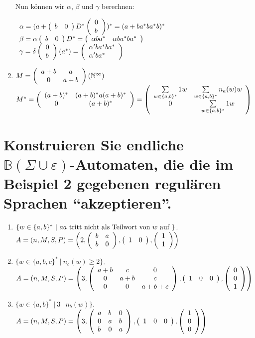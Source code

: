 \documentclass[]{scrartcl}
\newcommand{\matr}[2]{\left(\begin{array}{#1}#2\end{array}\right)}
\newcommand{\e}{\varepsilon}
\begin{document}
\begin{enumerate}
	Nun können wir $\alpha$, $\beta$ und $\gamma$ berechnen:
	
	$
		\begin{array}{l l}
			\alpha = (a + \matr{l l}{b & 0} D^* \matr{l}{0\\b})^* = (a + ba^*ba^*b)^*\\
			\beta = \alpha \matr{l l}{b & 0} D^* = \matr{l l}{\alpha ba^* & \alpha ba^*ba^*} \\
			\gamma = \delta \matr{l}{0\\b} (a^*) =
				\matr{l}{
					\alpha' ba^*ba^*\\
					\alpha' ba^*\\
						}
		\end{array}
	$
	
	\item $ M = \matr{c c}{a+b & a \\ 0 & a+b}  (\mathbb{N}^\infty)$\\
	
	$M^* = \matr{c c}{
		(a+b)^* & (a+b)^*a(a+b)^*\\
		0 & (a+b)^*
	} =
	\matr{c c}{
		\sum\limits_{w \in \{a, b\}^*} 1w & \sum\limits_{w \in \{a,b\}^*} n_a(w)w \\
		0 & \sum\limits_{w \in \{a,b\}^*} 1w\\
	}$
\end{enumerate}

\section{Konstruieren Sie endliche $\mathbb{B}(\Sigma \cup \e)$-Automaten, die die im Beispiel 2 gegebenen regulären Sprachen ``akzeptieren''.}

\begin{enumerate}
	\item $\{w \in \{ a,b \}^*\ |\ aa \textnormal{ tritt nicht als Teilwort von } w \textnormal{ auf } \}$.\\
	
	$A = (n,M,S,P) = \left(2, \matr{l l}{b & a \\ b & 0}, \matr{l l}{1 & 0}, \matr{l}{1\\1}\right)$
	
	\item $\{w \in \{ a,b,c \}^*\ |\ n_c(w) \geq 2 \}$.\\
	
	$A = (n,M,S,P) = \left(3, \matr{c c c}{a+b & c & 0 \\ 0 & a+b & c \\ 0 & 0 & a+b+c}, \matr{l l l}{1 & 0 & 0}, \matr{l}{0\\0\\1}\right)$
	
	\item $\{w \in \{ a,b \}^*\ |\ 3\ |\ n_b(w) \}$.\\
	
	$A = (n,M,S,P) = \left(3, \matr{l l l}{a & b & 0 \\ 0 & a & b \\ b & 0 & a}, \matr{l l l}{1 & 0 & 0}, \matr{l}{1\\0\\0}\right)$
\end{enumerate}
\end{document}

